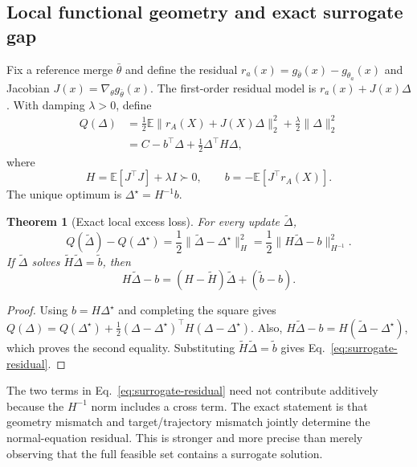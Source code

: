 \documentclass[letterpaper]{article} %
\theoremstyle{plain}
\newtheorem{theorem}{Theorem}
\theoremstyle{definition}
\begin{document}
\subsection{Local functional geometry and exact surrogate gap}
\label{app:local-gap}

Fix a reference merge $\bar\theta$ and define the residual $r_a(x)=g_{\bar\theta}(x)-g_{\theta_a}(x)$ and Jacobian $J(x)=\nabla_\theta g_{\bar\theta}(x)$.
The first-order residual model is $r_a(x)+J(x)\Delta$.
With damping $\lambda>0$, define
\begin{align}
Q(\Delta)
&=\frac12\mathbb E\|r_A(X)+J(X)\Delta\|_2^2
  +\frac\lambda2\|\Delta\|_2^2 \\
&=C-b^\top\Delta+\frac12\Delta^\top H\Delta,
\label{eq:Q-def}
\end{align}
where
\begin{equation}
H=\mathbb E[J^\top J]+\lambda I\succ0,
\qquad
b=-\mathbb E[J^\top r_A(X)].
\label{eq:H-b}
\end{equation}
The unique optimum is $\Delta^\star=H^{-1}b$.

\begin{theorem}[Exact local excess loss]
\label{thm:exact-gap}
For every update $\widetilde\Delta$,
\begin{equation}
Q(\widetilde\Delta)-Q(\Delta^\star)
=\frac12\|\widetilde\Delta-\Delta^\star\|_H^2
=\frac12\|H\widetilde\Delta-b\|_{H^{-1}}^2.
\label{eq:exact-gap}
\end{equation}
If $\widetilde\Delta$ solves $\widetilde H\widetilde\Delta=\widetilde b$, then
\begin{equation}
H\widetilde\Delta-b
=(H-\widetilde H)\widetilde\Delta+(\widetilde b-b).
\label{eq:surrogate-residual}
\end{equation}
\end{theorem}

\begin{proof}
Using $b=H\Delta^\star$ and completing the square gives $Q(\Delta)=Q(\Delta^\star)+ \frac12(\Delta-\Delta^\star)^\top H(\Delta-\Delta^\star)$.
Also, $H\widetilde\Delta-b=H(\widetilde\Delta-\Delta^\star)$, which proves the second equality.
Substituting $\widetilde H\widetilde\Delta=\widetilde b$ gives Eq.~\eqref{eq:surrogate-residual}.
\end{proof}

The two terms in Eq.~\eqref{eq:surrogate-residual} need not contribute additively because the $H^{-1}$ norm includes a cross term.
The exact statement is that geometry mismatch and target/trajectory mismatch jointly determine the normal-equation residual.
This is stronger and more precise than merely observing that the full feasible set contains a surrogate solution.
\end{document}
